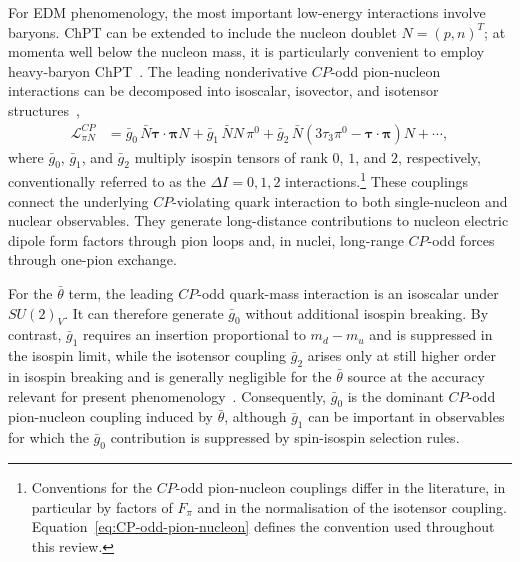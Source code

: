 \documentclass[review]{elsarticle}
\numberwithin{equation}{section}
\numberwithin{table}{section}
\numberwithin{figure}{section}
\begin{document}
For EDM phenomenology, the most important low-energy interactions involve baryons. ChPT can be extended to include the nucleon doublet $N=(p,n)^T$; at momenta well below the nucleon mass, it is particularly convenient to employ heavy-baryon ChPT~\cite{Jenkins:1990jv,Bernard:1995dp}. The leading nonderivative $CP$-odd pion-nucleon interactions can be decomposed into isoscalar, isovector, and isotensor structures~\cite{Mereghetti:2010tp,deVries:2012ab,Bsaisou:2014oka,Engel:2013lsa},
\begin{align}
    \mathcal{L}^{CP}_{\pi N} 
    &= 
    \bar g_0\,\bar N\bm{\tau}\cdot\bm{\pi}N + \bar g_1\,\bar N N\,\pi^0 + \bar g_2\,\bar N \left( 3\tau_3\pi^0-\bm{\tau}\cdot\bm{\pi} \right)N +\cdots ,
    \label{eq:CP-odd-pion-nucleon}
\end{align}
where $\bar g_0$, $\bar g_1$, and $\bar g_2$ multiply isospin tensors of rank $0$, $1$, and $2$, respectively, conventionally referred to as the $\Delta I=0,1,2$ interactions.\footnote{Conventions for the $CP$-odd pion-nucleon couplings differ in the literature, in particular by factors of $F_\pi$ and in the normalisation of the isotensor coupling. Equation~\eqref{eq:CP-odd-pion-nucleon} defines the convention used throughout this review.} These couplings connect the underlying $CP$-violating quark interaction to both single-nucleon and nuclear observables. They generate long-distance contributions to nucleon electric dipole form factors through pion loops and, in nuclei, long-range $CP$-odd forces through one-pion exchange.

For the $\bar\theta$ term, the leading $CP$-odd quark-mass interaction is an isoscalar under $SU(2)_V$. It can therefore generate $\bar g_0$ without additional isospin breaking. By contrast, $\bar g_1$ requires an insertion proportional to $m_d-m_u$ and is suppressed in the isospin limit, while the isotensor coupling $\bar g_2$ arises only at still higher order in isospin breaking and is generally negligible for the $\bar\theta$ source at the accuracy relevant for present phenomenology~\cite{Mereghetti:2010tp,deVries:2015una,Bsaisou:2014oka}. Consequently, $\bar g_0$ is the dominant $CP$-odd pion-nucleon coupling induced by $\bar\theta$, although $\bar g_1$ can be important in observables for which the $\bar g_0$ contribution is suppressed by spin-isospin selection rules.
\end{document}
